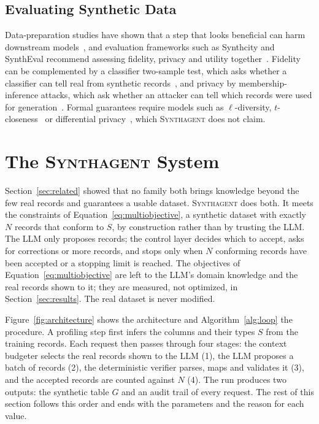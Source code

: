 \documentclass[conference]{IEEEtran}
\newcommand{\system}{\textsc{Synthagent}\xspace}
\begin{document}
\subsection{Evaluating Synthetic Data}
Data-preparation studies have shown that a step that looks beneficial can harm downstream models~\cite{li2021cleanml,guha2023cleaningfairness}, and evaluation frameworks such as Synthcity and SynthEval recommend assessing fidelity, privacy and utility together~\cite{qian2023synthcity,lautrup2025syntheval}. Fidelity can be complemented by a classifier two-sample test, which asks whether a classifier can tell real from synthetic records~\cite{lopezpaz2017c2st}, and privacy by membership-inference attacks, which ask whether an attacker can tell which records were used for generation~\cite{shokri2017mia,hyeong2022tabularmia}. Formal guarantees require models such as $\ell$-diversity, $t$-closeness~\cite{machanavajjhala2006ldiversity,li2007tcloseness} or differential privacy~\cite{dwork2014dp}, which \system does not claim.

\section{The \system System}
\label{sec:system}
Section~\ref{sec:related} showed that no family both brings knowledge beyond the few real records and guarantees a usable dataset. \system does both. It meets the constraints of Equation~\eqref{eq:multiobjective}, a synthetic dataset with exactly $N$ records that conform to $S$, by construction rather than by trusting the LLM. The LLM only proposes records; the control layer decides which to accept, asks for corrections or more records, and stops only when $N$ conforming records have been accepted or a stopping limit is reached. The objectives of Equation~\eqref{eq:multiobjective} are left to the LLM's domain knowledge and the real records shown to it; they are measured, not optimized, in Section~\ref{sec:results}. The real dataset is never modified.

Figure~\ref{fig:architecture} shows the architecture and Algorithm~\ref{alg:loop} the procedure. A profiling step first infers the columns and their types $S$ from the training records. Each request then passes through four stages: the context budgeter selects the real records shown to the LLM (1), the LLM proposes a batch of records (2), the deterministic verifier parses, maps and validates it (3), and the accepted records are counted against $N$ (4). The run produces two outputs: the synthetic table $G$ and an audit trail of every request. The rest of this section follows this order and ends with the parameters and the reason for each value.
\end{document}
